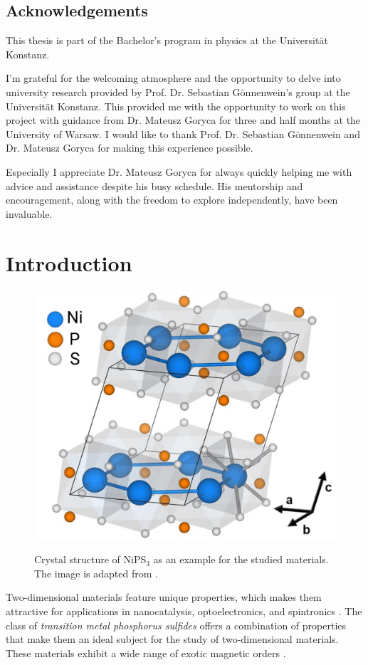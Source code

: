 \documentclass[
	oneside,
	parskip=half,
	a4paper,
]{scrbook}
\begin{document}
\cleardoublepage
\section*{Acknowledgements}
This thesis is part of the Bachelor's program in physics at the Universität Konstanz.

I'm grateful for the welcoming atmosphere and the opportunity to delve into university research provided by Prof. Dr. Sebastian Gönnenwein's group at the Universität Konstanz. 
This provided me with the opportunity to work on this project with guidance from Dr. Mateusz Goryca for three and half months at the University of Warsaw.
I would like to thank Prof. Dr. Sebastian Gönnenwein and Dr. Mateusz Goryca for making this experience possible.

Especially I appreciate Dr. Mateusz Goryca for always quickly helping me with advice and assistance despite his busy schedule.
His mentorship and encouragement, along with the freedom to explore independently, have been invaluable.


\cleardoublepage
{
	\sffamily
	\hypersetup{hidelinks}
	\tableofcontents
}

\mainmatter

\chapter{Introduction}
\begin{figure}
	\includegraphics[width=.4\textwidth]{../../figures/crystal structures/NiPS3 3d.png}\\
	\caption{}
	Crystal structure of NiPS$_3$ as an example for the studied materials.
	The image is adapted from \cite{NiPS3_coherent}.
	\label{fig:crystal structure}
\end{figure}
Two-dimensional materials feature unique properties, which makes them attractive for applications in nanocatalysis, optoelectronics, and spintronics \cite{MPX_review}.
The class of \textit{transition metal phosphorus sulfides} offers a combination of properties that make them an ideal subject for the study of two-dimensional materials.
These materials exhibit a wide range of exotic magnetic orders \cite{AFM_review}.
\end{document}
